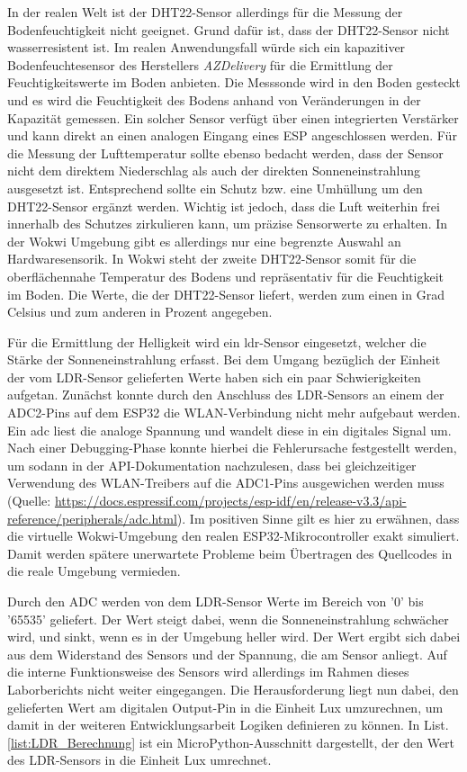 In der realen Welt ist der DHT22-Sensor allerdings für die Messung der Bodenfeuchtigkeit nicht geeignet. Grund dafür ist, dass der DHT22-Sensor nicht wasserresistent ist. Im realen Anwendungsfall würde sich ein kapazitiver Bodenfeuchtesensor des Herstellers \textit{AZDelivery} für die Ermittlung der Feuchtigkeitswerte im Boden anbieten. Die Messsonde wird in den Boden gesteckt und es wird die Feuchtigkeit des Bodens anhand von Veränderungen in der Kapazität gemessen. Ein solcher Sensor verfügt über einen integrierten Verstärker und kann direkt an einen analogen Eingang eines ESP angeschlossen werden. \newline
Für die Messung der Lufttemperatur sollte ebenso bedacht werden, dass der Sensor nicht dem direktem Niederschlag als auch der direkten Sonneneinstrahlung ausgesetzt ist. Entsprechend sollte ein Schutz bzw. eine Umhüllung um den DHT22-Sensor ergänzt werden. Wichtig ist jedoch, dass die Luft weiterhin frei innerhalb des Schutzes zirkulieren kann, um präzise Sensorwerte zu erhalten.\newline
In der Wokwi Umgebung gibt es allerdings nur eine begrenzte Auswahl an Hardwaresensorik. In Wokwi steht der zweite DHT22-Sensor somit für die oberflächennahe Temperatur des Bodens und repräsentativ für die Feuchtigkeit im Boden. Die Werte, die der DHT22-Sensor liefert, werden zum einen in Grad Celsius und zum anderen in Prozent angegeben.

Für die Ermittlung der Helligkeit wird ein \gls{ldr}-Sensor eingesetzt, welcher die Stärke der Sonneneinstrahlung erfasst. Bei dem Umgang bezüglich der Einheit der vom LDR-Sensor gelieferten Werte haben sich ein paar Schwierigkeiten aufgetan.
Zunächst konnte durch den Anschluss des LDR-Sensors an einem der ADC2-Pins auf dem ESP32 die WLAN-Verbindung nicht mehr aufgebaut werden. Ein \gls{adc} liest die analoge Spannung und wandelt diese in ein digitales Signal um.
Nach einer Debugging-Phase konnte hierbei die Fehlerursache festgestellt werden, um sodann in der API-Dokumentation nachzulesen, dass bei gleichzeitiger Verwendung des WLAN-Treibers auf die ADC1-Pins ausgewichen werden muss (Quelle: \url{https://docs.espressif.com/projects/esp-idf/en/release-v3.3/api-reference/peripherals/adc.html}). Im positiven Sinne gilt es hier zu erwähnen, dass die virtuelle Wokwi-Umgebung den realen ESP32-Mikrocontroller exakt simuliert. Damit werden spätere unerwartete Probleme beim Übertragen des Quellcodes in die reale Umgebung vermieden.

Durch den ADC werden von dem LDR-Sensor Werte im Bereich von '0' bis '65535' geliefert. Der Wert steigt dabei, wenn die Sonneneinstrahlung schwächer wird, und sinkt, wenn es in der Umgebung heller wird. Der Wert ergibt sich dabei aus dem Widerstand des Sensors und der Spannung, die am Sensor anliegt. Auf die interne Funktionsweise des Sensors wird allerdings im Rahmen dieses Laborberichts nicht weiter eingegangen. Die Herausforderung liegt nun dabei, den gelieferten Wert am digitalen Output-Pin in die Einheit Lux umzurechnen, um damit in der weiteren Entwicklungsarbeit Logiken definieren zu können. In List. \ref{list:LDR_Berechnung} ist ein MicroPython-Ausschnitt dargestellt, der den Wert des LDR-Sensors in die Einheit Lux umrechnet.


